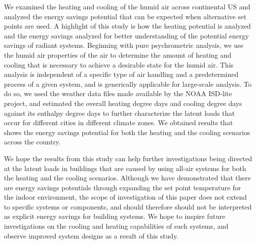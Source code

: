 We examined the heating and cooling of the humid air across continental US and analyzed the energy savings potential that can be expected when alternative set points are used. A highlight of this study is how the heating potential is analyzed and the energy savings analyzed for better understanding of the potential energy savings of radiant systems. Beginning with pure psychrometric analysis, we use the humid air properties of the air to determine the amount of heating and cooling that is necessary to achieve a desirable state for the humid air. This analysis is independent of a specific type of air handling and a predetermined process of a given system, and is generically applicable for large-scale analysis. To do so, we used the weather data files made available by the NOAA ISD-lite project, and estimated the overall heating degree days and cooling degree days against its enthalpy degree days to further characterize the latent loads that occur for different cities in different climate zones. We obtained results that shows the energy savings potential for both the heating and the cooling scenarios across the country.

We hope the results from this study can help further investigations being directed at the latent loads in buildings that are caused by using all-air systems for both the heating and the cooling scenarios. Although we have demonstrated that there are energy savings potentials through expanding the set point temperature for the indoor environment, the scope of investigation of this paper does not extend to specific systems or components, and should therefore should not be interpreted as explicit energy savings for building systems. We hope to inspire future investigations on the cooling and heating capabilities of such systems, and observe improved system designs as a result of this study.